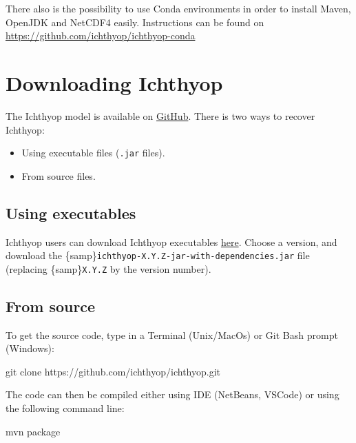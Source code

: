 \documentclass[
  letterpaper,
  DIV=11,
  numbers=noendperiod]{scrreprt}
\newenvironment{Shaded}{\begin{snugshade}}{\end{snugshade}}
\newcommand{\ExtensionTok}[1]{\textcolor[rgb]{0.00,0.23,0.31}{#1}}
\newcommand{\FunctionTok}[1]{\textcolor[rgb]{0.28,0.35,0.67}{#1}}
\newcommand{\NormalTok}[1]{\textcolor[rgb]{0.00,0.23,0.31}{#1}}
\providecommand{\tightlist}{%
  \setlength{\itemsep}{0pt}\setlength{\parskip}{0pt}}\usepackage{longtable,booktabs,array}
\begin{document}
There also is the possibility to use Conda environments in order to
install Maven, OpenJDK and NetCDF4 easily. Instructions can be found on
\url{https://github.com/ichthyop/ichthyop-conda}

\section{Downloading Ichthyop}\label{sec-osm-inst}

The Ichthyop model is available on
\href{https://github.com/ichthyop/ichthyop}{GitHub}. There is two ways
to recover Ichthyop:

\begin{itemize}
\tightlist
\item
  Using executable files (\texttt{.jar} files).
\item
  From source files.
\end{itemize}

\subsection{Using executables}\label{using-executables}

Ichthyop users can download Ichthyop executables
\href{https://github.com/ichthyop/ichthyop/releases}{here}. Choose a
version, and download the
\{samp\}\texttt{ichthyop-X.Y.Z-jar-with-dependencies.jar} file
(replacing \{samp\}\texttt{X.Y.Z} by the version number).

\subsection{From source}\label{from-source}

To get the source code, type in a Terminal (Unix/MacOs) or Git Bash
prompt (Windows):

\begin{Shaded}
\begin{Highlighting}[]
\FunctionTok{git}\NormalTok{ clone https://github.com/ichthyop/ichthyop.git}
\end{Highlighting}
\end{Shaded}

The code can then be compiled either using IDE (NetBeans, VSCode) or
using the following command line:

\begin{Shaded}
\begin{Highlighting}[]
\ExtensionTok{mvn}\NormalTok{ package}
\end{Highlighting}
\end{Shaded}
\end{document}
